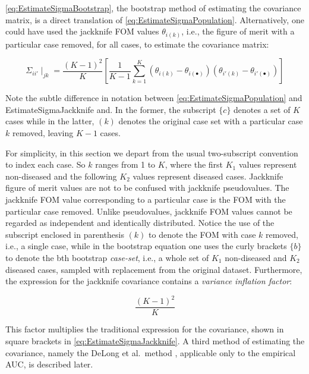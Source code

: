\documentclass[
]{book}
\begin{document}
\eqref{eq:EstimateSigmaBootstrap}, the bootstrap method of estimating the covariance matrix, is a direct translation of \eqref{eq:EstimateSigmaPopulation}. Alternatively, one could have used the jackknife FOM values \(\theta_{i(k)}\), i.e., the figure of merit with a particular case removed, for all cases, to estimate the covariance matrix:

\begin{equation}
\Sigma_{ii'}\mid_{jk} =\frac{(K-1)^2}{K} \left [ \frac{1}{K-1}\sum_{k=1}^{K} \left ( \theta_{i(k)} - \theta_{i(\bullet)} \right) \left ( \theta_{i'(k)} - \theta_{i'(\bullet)} \right) \right ]
\label{eq:EstimateSigmaJackknife}
\end{equation}

Note the subtle difference in notation between \eqref{eq:EstimateSigmaPopulation} and EstimateSigmaJackknife and. In the former, the subscript \(\{c\}\) denotes a set of \(K\) cases while in the latter, \((k)\) denotes the original case set with a particular case \(k\) removed, leaving \(K-1\) cases.

For simplicity, in this section we depart from the usual two-subscript convention to index each case. So \(k\) ranges from 1 to \(K\), where the first \(K_1\) values represent non-diseased and the following \(K_2\) values represent diseased cases. Jackknife figure of merit values are not to be confused with jackknife pseudovalues. The jackknife FOM value corresponding to a particular case is the FOM with the particular case removed. Unlike pseudovalues, jackknife FOM values cannot be regarded as independent and identically distributed. Notice the use of the subscript enclosed in parenthesis \((k)\) to denote the FOM with case \(k\) removed, i.e., a single case, while in the bootstrap equation one uses the curly brackets \(\{b\}\) to denote the bth bootstrap \emph{case-set}, i.e., a whole set of \(K_1\) non-diseased and \(K_2\) diseased cases, sampled with replacement from the original dataset. Furthermore, the expression for the jackknife covariance contains a \emph{variance inflation factor}:

\begin{equation}
\frac{(K-1)^2}{K}
\label{eq:JKVarianceInflationFactor}
\end{equation}

This factor multiplies the traditional expression for the covariance, shown in square brackets in \eqref{eq:EstimateSigmaJackknife}. A third method of estimating the covariance, namely the DeLong et al.~method \citep{RN112}, applicable only to the empirical AUC, is described later.
\end{document}

